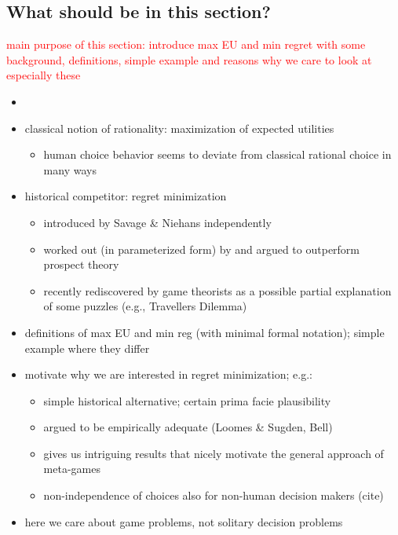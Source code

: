 \documentclass[fleqn,reqno,11pt]{article}
\newcommand{\myalert}[1]{\textcolor{red}{#1}}
\begin{document}
\subsection{What should be in this section?}

\myalert{main purpose of this section: introduce max EU and min regret with some background,
  definitions, simple example and reasons why we care to look at especially these}

\begin{itemize}
  \item {}
\item classical notion of rationality: maximization of expected utilities
  \begin{itemize}
  \item human choice behavior seems to deviate from classical rational choice in many ways
    \citep[most
    notably][]{TverskyKahnemann1974:Judgement-under,KahnemannTversky1979:Prospect-Theory}
  \end{itemize}
\item historical competitor: regret minimization
  \begin{itemize}
  \item introduced by Savage \& Niehans independently
  \item worked out (in parameterized form) by \citet{LoomesSugden1982:Regret-Theory:-} and
    argued to outperform prospect theory
  \item recently rediscovered by game theorists \citep{HalpernPass2012:Iterated-Regret} as a
    possible partial explanation of some puzzles (e.g., Travellers Dilemma)
  \end{itemize}
\item definitions of max EU and min reg (with minimal formal notation); simple example where
  they differ
\item motivate why we are interested in regret minimization; e.g.:
  \begin{itemize}
  \item simple historical alternative; certain prima facie plausibility
  \item argued to be empirically adequate (Loomes \& Sugden, Bell)
  \item gives us intriguing results that nicely motivate the general approach of meta-games
  \item non-independence of choices also for non-human decision makers (cite)
  \end{itemize}
\item here we care about game problems, not solitary decision problems
\end{itemize}
\end{document}
